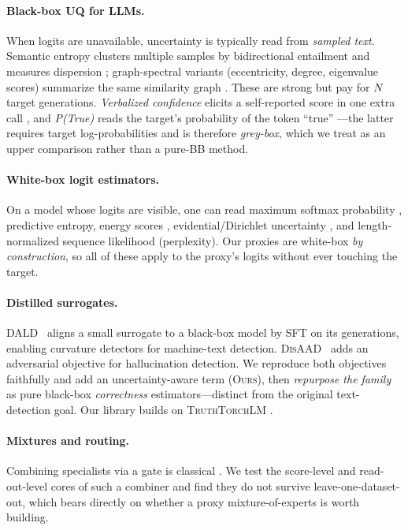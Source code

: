 \documentclass[11pt]{article}
\newcommand{\ours}{\textsc{Ours}}
\newcommand{\dald}{\textsc{DALD}}
\newcommand{\disaad}{\textsc{DisAAD}}
\begin{document}
\paragraph{Black-box UQ for LLMs.} When logits are unavailable, uncertainty is
typically read from \emph{sampled text}. Semantic entropy clusters multiple samples by
bidirectional entailment and measures dispersion
\citep{kuhn2023semantic,farquhar2024detecting}; graph-spectral variants
(eccentricity, degree, eigenvalue scores) summarize the same similarity graph
\citep{lin2023generating}. These are strong but pay for $N$ target generations.
\emph{Verbalized confidence} elicits a self-reported score in one extra call
\citep{lin2022teaching}, and \emph{P(True)} reads the target's probability of the token
``true'' \citep{kadavath2022language}---the latter requires target log-probabilities and
is therefore \emph{grey-box}, which we treat as an upper comparison rather than a
pure-BB method.

\paragraph{White-box logit estimators.} On a model whose logits are visible, one can
read maximum softmax probability \citep{hendrycks2017baseline}, predictive entropy,
energy scores \citep{liu2020energy}, evidential/Dirichlet uncertainty
\citep{sensoy2018evidential,malinin2021uncertainty}, and length-normalized sequence
likelihood (perplexity). Our proxies are white-box \emph{by construction}, so all of
these apply to the proxy's logits without ever touching the target.

\paragraph{Distilled surrogates.} \dald~\citep{zeng2024dald} aligns a small surrogate
to a black-box model by SFT on its generations, enabling curvature detectors
\citep{bao2024fastdetectgpt} for machine-text detection. \disaad~\citep{cui2026disaad}
adds an adversarial objective for hallucination detection. We reproduce both objectives
faithfully and add an uncertainty-aware term (\ours), then \emph{repurpose the family}
as pure black-box \emph{correctness} estimators---distinct from the original
text-detection goal. Our library builds on \textsc{TruthTorchLM}
\citep{bakman2024truthtorchlm}.

\paragraph{Mixtures and routing.} Combining specialists via a gate is classical
\citep{jacobs1991moe}. We test the score-level and read-out-level cores of such a
combiner and find they do not survive leave-one-dataset-out, which bears directly on
whether a proxy mixture-of-experts is worth building.
\end{document}
